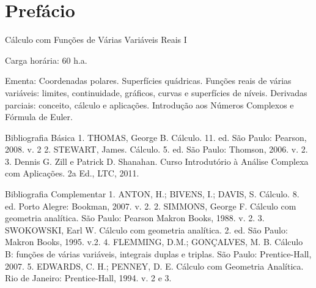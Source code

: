 \chapter*{Prefácio}

Cálculo com Funções de Várias Variáveis Reais I

Carga horária: 60 h.a.

Ementa: Coordenadas polares. Superfícies quádricas. Funções reais de várias
variáveis: limites, continuidade, gráficos, curvas e superfícies de níveis.
Derivadas parciais: conceito, cálculo e aplicações. Introdução aos Números
Complexos e Fórmula de Euler.

Bibliografia Básica
1. THOMAS, George B. Cálculo. 11. ed. São Paulo: Pearson, 2008. v. 2
2. STEWART, James. Cálculo. 5. ed. São Paulo: Thomson, 2006. v. 2.
3. Dennis G. Zill e Patrick D. Shanahan. Curso Introdutório à Análise Complexa com Aplicações. 2a Ed., LTC, 2011.

Bibliografia Complementar
1. ANTON, H.; BIVENS, I.; DAVIS, S. Cálculo. 8. ed. Porto Alegre: Bookman, 2007. v. 2.
2. SIMMONS, George F. Cálculo com geometria analítica. São Paulo: Pearson Makron Books, 1988. v. 2.
3. SWOKOWSKI, Earl W. Cálculo com geometria analítica. 2. ed. São Paulo: Makron Books, 1995. v.2.
4. FLEMMING, D.M.; GONÇALVES, M. B. Cálculo B: funções de várias variáveis, integrais duplas e triplas. São Paulo: Prentice-Hall, 2007.
5. EDWARDS, C. H.; PENNEY, D. E. Cálculo com Geometria Analítica. Rio de Janeiro: Prentice-Hall, 1994. v. 2 e 3.

